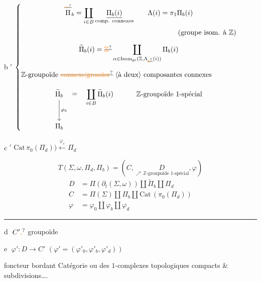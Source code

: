 \textcircled{b$'$}
\(\left\{\vcenter{\hbox{\begin{minipage}{.89\linewidth}

\[
 \overset{\deleted{\unsure{\sim}}}{\Pi}_b=\coprod_{i\in B}
 \underset{\text{comp. connexes}}{\underline{\Pi_b(i)}}
 \qquad \Lambda(i)=\pi_1\Pi_b(i)
\]
\hfill (groupe isom. à $\mathbb Z$)
\[
 \widetilde\Pi_b(i)=\deleted{\unsure{\mathbb Z}}
 \coprod_{\alpha\in\mathrm{Isom}_{\rm gr}(\mathbb Z,\Lambda_{\deleted{\unsure{b}}}(i))}
 \Pi_b(i)
\]
$\mathbb Z$-groupoïde \deleted{\unsure{connexe|grossier}} \inserted{à deux} composantes connexes
\diagram{\begin{tikzcd}[ampersand replacement=\&]
\widetilde\Pi_b \arrow[d,"\varphi_b"] \arrow[r,phantom,"="] \&
\displaystyle\coprod_{i\in B}\widetilde\Pi_b(i) \& \mathbb Z\text{-groupoïde }1\text{-spécial}\\
\Pi_b \& \&
\end{tikzcd}}


\end{minipage}}}\right.\)

\textcircled{c$'$}
$\mathrm{Cat}\,\pi_0(\Pi_d))\xleftarrow{\varphi_c}\Pi_d$

\[
 T(\Sigma,\omega,\Pi_d,\Pi_b)=(C,\underset{\nearrow\,\mathbb Z\text{-groupoïde }1\text{-spécial}}{D},\varphi)
\]
\[
\begin{aligned}
D&=\Pi(\partial_t(\Sigma,\omega))\amalg\widetilde\Pi_b\amalg\Pi_d\\
C&=\Pi(\Sigma)\amalg\Pi_b\amalg\mathrm{Cat}\,(\pi_0(\Pi_d))\\
\varphi&=\varphi_0\amalg\varphi_b\amalg\varphi_d
\end{aligned}
\]

\noindent\rule{\linewidth}{.4pt}

\textcircled{d} $C'\unsure{,}$ groupoïde

\textcircled{e} $\varphi':D\longrightarrow C'$ \qquad $(\varphi'=(\varphi'_0,\varphi'_b,\varphi'_d))$

\hspace{3em}foncteur bordant
Catégorie ou  des $1$-complexes topologiques compacts \& subdivisions\ldots.

